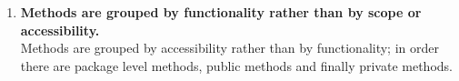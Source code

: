 \documentclass[a4paper,11pt]{report} %
\begin{document}
\begin{enumerate}[resume]
				
			\item \textbf{Methods are grouped by functionality rather than by scope or accessibility.}\smallskip \\
				Methods are grouped by accessibility rather than by functionality; in order there are package level methods, public methods and finally private methods.
			\setcounter{enumi}{27}
		\end{enumerate}
		\pagebreak
		
\end{document}
